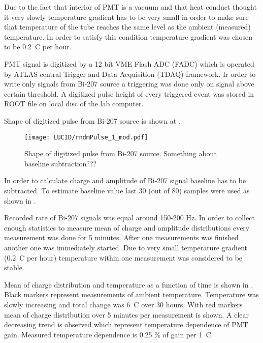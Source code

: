 Due to the fact that interior of PMT is a vacuum and that heat conduct thought it very slowly temperature gradient has to be very small in order to make sure 
that temperature of the tube reaches the same level as the ambient (measured) temperature.
In order to satisfy this condition temperature gradient was chosen to be 0.2\degree~C per hour.

PMT signal is digitized by a 12 bit VME Flash ADC (FADC) which is operated by ATLAS central Trigger and Data Acquisition (TDAQ) framework.
Ir order to write only signals from Bi-207 source a triggering was done only on signal above certain threshold.
A digitized pulse height of every triggered event was stored in ROOT file on local disc of the lab computer.

Shape of digitized pulse from Bi-207 source is shown at . 

\begin{figure}
\centering
\texttt{[image: LUCID/rndmPulse\_1\_mod.pdf]}
\caption{Shape of digitized pulse from Bi-207 source. Something about baseline subtraction??? }
\label{fig:bi207DigitizedPulse}
\end{figure}

In order to calculate charge and amplitude of Bi-207 signal baseline has to be subtracted. 
To estimate baseline value last 30 (out of 80) samples were used as shown in .

Recorded rate of Bi-207 signals was equal around 150-200 Hz. In order to collect enough statistics to measure mean of charge and amplitude distributions
every measurement was done for 5 minutes. After one measurements was finished another one was immediately started.
Due to very small temperature gradient (0.2\degree~C per hour) temperature within one measurement was considered to be stable.

Mean of charge distribution and temperature as a function of time is shown in .
Black markers represent measurements of ambient temperature. Temperature was slowly increasing and total change was 6\degree~C over 30 hours.
With red markers mean of charge distribution over 5 minutes per measurement is shown.
A clear decreasing trend is observed which represent temperature dependence of PMT gain.
Measured temperature dependence is 0.25 $\%$ of gain per 1\degree~C. 




